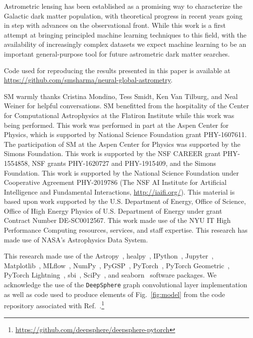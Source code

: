 \documentclass[preprint]{article}
\begin{document}
Astrometric lensing has been established as a promising way to characterize the Galactic dark matter population, with theoretical progress in recent years going in step with advances on the observational front. While this work is a first attempt at bringing principled machine learning techniques to this field, with the availability of increasingly complex datasets we expect machine learning to be an important general-purpose tool for future astrometric dark matter searches.

Code used for reproducing the results presented in this paper is available at \url{https://github.com/smsharma/neural-global-astrometry}. 

\begin{ack}
SM warmly thanks Cristina Mondino, Tess Smidt, Ken Van Tilburg, and Neal Weiner for helpful conversations. SM benefitted from the hospitality of the Center for Computational Astrophysics at the Flatiron Institute while this work was being performed. 
This work was performed in part at the Aspen Center for Physics, which is supported by National Science Foundation grant PHY-1607611.
The participation of SM at the Aspen Center for Physics was supported by the Simons Foundation.
This work is supported by the NSF CAREER grant PHY-1554858, NSF grants PHY-1620727 and PHY-1915409, and the Simons Foundation. 
This work is supported by the National Science Foundation under Cooperative Agreement PHY-2019786 (The NSF AI Institute for Artificial Intelligence and Fundamental Interactions, \url{http://iaifi.org/}).
This material is based upon work supported by the U.S. Department of Energy, Office of Science, Office of High Energy Physics of U.S. Department of Energy under grant Contract Number DE-SC0012567.
This work made use of the NYU IT High Performance Computing resources, services, and staff expertise. 
This research has made use of NASA's Astrophysics Data System. 

This research made use of the Astropy~\cite{Robitaille:2013mpa,Price-Whelan:2018hus},
healpy~\cite{Gorski:2004by,Zonca2019},
IPython~\cite{PER-GRA:2007},
Jupyter~\cite{Kluyver2016JupyterN},
Matplotlib~\cite{Hunter:2007},
MLflow~\cite{chen2020developments},
NumPy~\cite{harris_array_2020},
PyGSP~\cite{michael_defferrard_2017_1003158},
PyTorch~\cite{NEURIPS2019_9015},
PyTorch Geometric~\cite{Fey/Lenssen/2019}, 
PyTorch Lightning~\cite{william_falcon_2020_3828935},
sbi~\cite{tejero-cantero2020sbi},
SciPy~\cite{2020SciPy-NMeth}, and
seaborn~\cite{michael_waskom_2017_883859}
software packages.
We acknowledge the use of the \texttt{DeepSphere} graph convolutional layer implementation as well as code used to produce elements of Fig.~\ref{fig:model} from the code repository associated with Ref.~\cite{defferrard2020deepsphere}.\footnote{\url{https://github.com/deepsphere/deepsphere-pytorch}}
\end{ack}



{
\small

}
\end{document}
